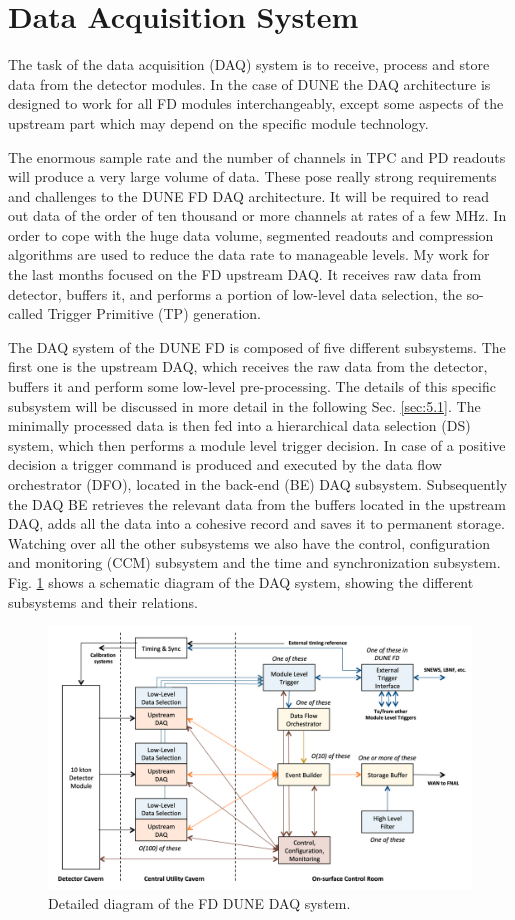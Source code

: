 \section{Data Acquisition System}

The task of the data acquisition (DAQ) system is to receive, process and store data from the detector modules. In the case of DUNE the DAQ architecture is designed to work for all FD modules interchangeably, except some aspects of the upstream part which may depend on the specific module technology.

The enormous sample rate and the number of channels in TPC and PD readouts will produce a very large volume of data. These pose really strong requirements and challenges to the DUNE FD DAQ architecture. It will be required to read out data of the order of ten thousand or more channels at rates of a few MHz. In order to cope with the huge data volume, segmented readouts and compression algorithms are used to reduce the data rate to manageable levels. My work for the last months focused on the FD upstream DAQ. It receives raw data from detector, buffers it, and performs a portion of low-level data selection, the so-called Trigger Primitive (TP) generation.

The DAQ system of the DUNE FD is composed of five different subsystems. The first one is the upstream DAQ, which receives the raw data from the detector, buffers it and perform some low-level pre-processing. The details of this specific subsystem will be discussed in more detail in the following Sec. \ref{sec:5.1}. The minimally processed data is then fed into a hierarchical data selection (DS) system, which then performs a module level trigger decision. In case of a positive decision a trigger command is produced and executed by the data flow orchestrator (DFO), located in the back-end (BE) DAQ subsystem. Subsequently the DAQ BE retrieves the relevant data from the buffers located in the upstream DAQ, adds all the data into a cohesive record and saves it to permanent storage. Watching over all the other subsystems we also have the control, configuration and monitoring (CCM) subsystem and the time and synchronization subsystem. Fig. \ref{fig:daq1} shows a schematic diagram of the DAQ system, showing the different subsystems and their relations.

\begin{figure}[t]
	\centering
	\includegraphics[width=0.8\linewidth]{Images/DUNE/FD/DAQ_detailed2}
	\caption{Detailed diagram of the FD DUNE DAQ system.}
	\label{fig:daq1}
\end{figure}

